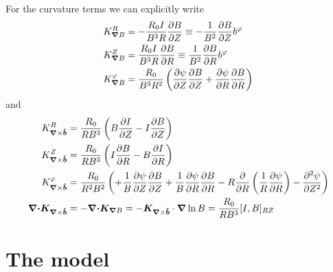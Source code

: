 For the curvature terms we can explicitly write
\begin{align}
K_{{\boldsymbol{\nabla}} B}^R &= -\frac{R_0 I}{B^3R}\frac{\partial B}{\partial Z} \equiv -\frac{1}{B^2}\frac{\partial B}{\partial Z}b^\varphi \\
K_{{\boldsymbol{\nabla}} B}^Z &= \frac{R_0 I}{B^3R}\frac{\partial B}{\partial R}\equiv \frac{1}{B^2}\frac{\partial B}{\partial R}b^\varphi \\
K_{{\boldsymbol{\nabla}} B}^\varphi &= \frac{R_0}{B^3R^2}\left(
      \frac{\partial \psi}{\partial Z} \frac{\partial B}{\partial Z}
    + \frac{\partial \psi}{\partial R}\frac{\partial B}{\partial R}\right)
\label{}
\end{align}
and
\begin{align}
K_{{\boldsymbol{\nabla}}\times\bm{\hat{b}}}^R &= \frac{R_0 }{RB^3}\left( B\frac{\partial I}{\partial Z} -I\frac{\partial B}{\partial Z}\right) \\
K_{{\boldsymbol{\nabla}}\times\bm{\hat{b}}}^Z &= \frac{R_0 }{RB^3} \left( I\frac{\partial B}{\partial R} - B\frac{\partial I}{\partial R} \right)\\
K_{{\boldsymbol{\nabla}}\times\bm{\hat{b}}}^\varphi &= \frac{R_0}{R^2B^2}\left(
+ \frac{1}{B}\frac{\partial\psi}{\partial Z} \frac{\partial B}{\partial Z}
+ \frac{1}{B}\frac{\partial \psi}{\partial R}\frac{\partial B}{\partial R}
-R\frac{\partial}{\partial R}\left(\frac{1}{R}\frac{\partial\psi}{\partial R}\right) 
- \frac{\partial^2 \psi}{\partial Z^2}
\right) \\
{\boldsymbol{{\boldsymbol{\nabla}}\cdot}}{{\boldsymbol{K}}_{{\boldsymbol{\nabla}}\times\bm{\hat{b}}}} &= -{\boldsymbol{{\boldsymbol{\nabla}}\cdot}}{{\boldsymbol{K}}_{{\boldsymbol{\nabla}} B}}= -{{\boldsymbol{K}}_{{\boldsymbol{\nabla}}\times\bm{\hat{b}}}}\cdot{\boldsymbol{\nabla}}\ln B = \frac{R_0}{RB^3}[I,B]_{RZ}
\label{}
\end{align}

\section{The model} \label{sec:model}
